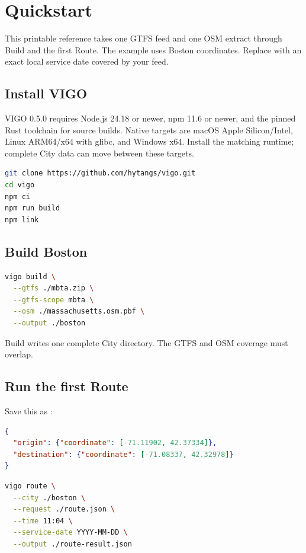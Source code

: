 \documentclass[10pt,letterpaper]{article}
\begin{document}
\guideheader

\section{Quickstart}

This printable reference takes one GTFS feed and one OSM extract through Build and the first Route. The example uses Boston coordinates. Replace  with an exact local service date covered by your feed.

\subsection{Install VIGO}

VIGO 0.5.0 requires Node.js 24.18 or newer, npm 11.6 or newer, and the pinned Rust toolchain for source builds. Native targets are macOS Apple Silicon/Intel, Linux ARM64/x64 with glibc, and Windows x64. Install the matching runtime; complete City data can move between these targets.

\begin{lstlisting}[language=bash]
git clone https://github.com/hytangs/vigo.git
cd vigo
npm ci
npm run build
npm link
\end{lstlisting}

\subsection{Build Boston}

\begin{lstlisting}[language=bash]
vigo build \
  --gtfs ./mbta.zip \
  --gtfs-scope mbta \
  --osm ./massachusetts.osm.pbf \
  --output ./boston
\end{lstlisting}

Build writes one complete City directory. The GTFS and OSM coverage must overlap.

\subsection{Run the first Route}

Save this as \code{route.json}:

\begin{lstlisting}[language=json]
{
  "origin": {"coordinate": [-71.11902, 42.37334]},
  "destination": {"coordinate": [-71.08337, 42.32978]}
}
\end{lstlisting}

\begin{lstlisting}[language=bash]
vigo route \
  --city ./boston \
  --request ./route.json \
  --time 11:04 \
  --service-date YYYY-MM-DD \
  --output ./route-result.json
\end{lstlisting}
\end{document}
